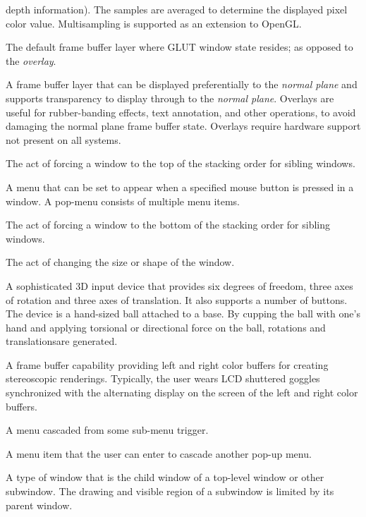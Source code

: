 \documentclass[titlepage,twoside]{article}
\begin{document}
\begin{description}
depth information).  The samples are averaged to determine the
displayed pixel color value.  Multisampling is supported as an
extension to OpenGL.
\item[{\em \ndx{Normal plane}}]  The default frame buffer layer where GLUT window
state resides; as opposed to the {\em overlay}.
\item[{\em \ndx{Overlay}}]  A frame buffer layer that can be displayed preferentially
to the {\em normal plane} and supports transparency to display through to the
{\em normal plane}.  Overlays are useful for rubber-banding effects, text
annotation, and other operations, to avoid damaging the normal plane frame
buffer state.  Overlays require hardware support not present on all systems.
\item[{\em \ndx{Pop}}]  The act of forcing a window to the top of the
stacking order for sibling windows.
\item[{\em \ndx{Pop-up menu}}]  A menu that can be set to appear when a specified
mouse button is pressed in a window.  A pop-menu consists of multiple
menu items.
\item[{\em \ndx{Push}}]  The act of forcing a window to the bottom of the
stacking order for sibling windows.
\item[{\em \ndx{Reshape}}]  The act of changing the size or shape of the window.
\item[{\em \ndx{Spaceball}}]  A sophisticated 3D input device that provides 
six degrees of freedom, three axes of rotation and three axes of
translation.  It also supports a number
of buttons.  The device is a hand-sized ball attached to a base.  By
cupping the ball with one's hand and applying torsional or directional force
on the ball, rotations and translationsare generated.
\item[{\em \ndx{Stereo}}]  A frame buffer capability providing left
  and right color buffers for creating stereoscopic renderings.  Typically,
  the user wears LCD shuttered goggles synchronized with the alternating
  display on the screen of the left and right color buffers.
\item[{\em \ndx{Sub-menu}}]  A menu cascaded from some sub-menu trigger.
\item[{\em \ndx{Sub-menu trigger}}]  A menu item that the user can enter to
cascade another pop-up menu.
\item[{\em \ndx{Subwindow}}]  A type of window that is the child window of
a top-level window or other subwindow.  The drawing and visible region
of a subwindow is limited by its parent window.

\end{description}
\end{document}
